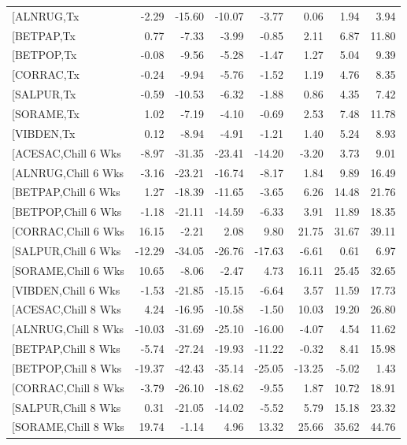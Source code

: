 \documentclass{article}\usepackage[]{graphicx}\usepackage[]{color}
\begin{document}
\begin{longtable}{lrrrrrrr}
  [ALNRUG,Tx & -2.29 & -15.60 & -10.07 & -3.77 & 0.06 & 1.94 & 3.94 \\ 
  [BETPAP,Tx & 0.77 & -7.33 & -3.99 & -0.85 & 2.11 & 6.87 & 11.80 \\ 
  [BETPOP,Tx & -0.08 & -9.56 & -5.28 & -1.47 & 1.27 & 5.04 & 9.39 \\ 
  [CORRAC,Tx & -0.24 & -9.94 & -5.76 & -1.52 & 1.19 & 4.76 & 8.35 \\ 
  [SALPUR,Tx & -0.59 & -10.53 & -6.32 & -1.88 & 0.86 & 4.35 & 7.42 \\ 
  [SORAME,Tx & 1.02 & -7.19 & -4.10 & -0.69 & 2.53 & 7.48 & 11.78 \\ 
  [VIBDEN,Tx & 0.12 & -8.94 & -4.91 & -1.21 & 1.40 & 5.24 & 8.93 \\ 
  [ACESAC,Chill 6 Wks & -8.97 & -31.35 & -23.41 & -14.20 & -3.20 & 3.73 & 9.01 \\ 
  [ALNRUG,Chill 6 Wks & -3.16 & -23.21 & -16.74 & -8.17 & 1.84 & 9.89 & 16.49 \\ 
  [BETPAP,Chill 6 Wks & 1.27 & -18.39 & -11.65 & -3.65 & 6.26 & 14.48 & 21.76 \\ 
  [BETPOP,Chill 6 Wks & -1.18 & -21.11 & -14.59 & -6.33 & 3.91 & 11.89 & 18.35 \\ 
  [CORRAC,Chill 6 Wks & 16.15 & -2.21 & 2.08 & 9.80 & 21.75 & 31.67 & 39.11 \\ 
  [SALPUR,Chill 6 Wks & -12.29 & -34.05 & -26.76 & -17.63 & -6.61 & 0.61 & 6.97 \\ 
  [SORAME,Chill 6 Wks & 10.65 & -8.06 & -2.47 & 4.73 & 16.11 & 25.45 & 32.65 \\ 
  [VIBDEN,Chill 6 Wks & -1.53 & -21.85 & -15.15 & -6.64 & 3.57 & 11.59 & 17.73 \\ 
  [ACESAC,Chill 8 Wks & 4.24 & -16.95 & -10.58 & -1.50 & 10.03 & 19.20 & 26.80 \\ 
  [ALNRUG,Chill 8 Wks & -10.03 & -31.69 & -25.10 & -16.00 & -4.07 & 4.54 & 11.62 \\ 
  [BETPAP,Chill 8 Wks & -5.74 & -27.24 & -19.93 & -11.22 & -0.32 & 8.41 & 15.98 \\ 
  [BETPOP,Chill 8 Wks & -19.37 & -42.43 & -35.14 & -25.05 & -13.25 & -5.02 & 1.43 \\ 
  [CORRAC,Chill 8 Wks & -3.79 & -26.10 & -18.62 & -9.55 & 1.87 & 10.72 & 18.91 \\ 
  [SALPUR,Chill 8 Wks & 0.31 & -21.05 & -14.02 & -5.52 & 5.79 & 15.18 & 23.32 \\ 
  [SORAME,Chill 8 Wks & 19.74 & -1.14 & 4.96 & 13.32 & 25.66 & 35.62 & 44.76 \\ 

\end{longtable}
\end{document}
